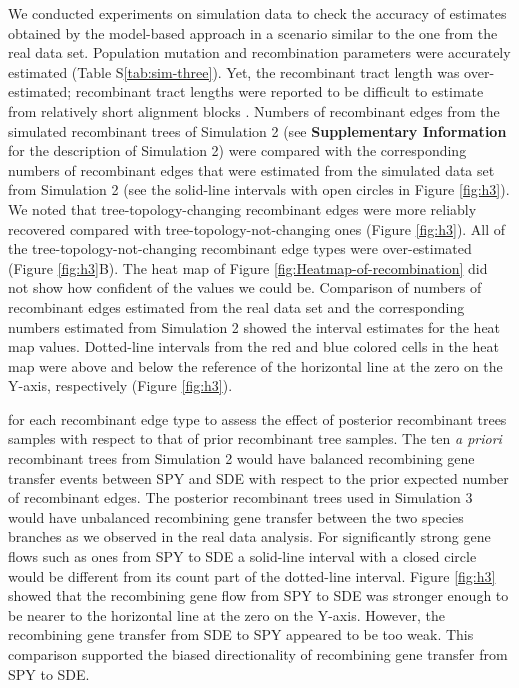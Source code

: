 \documentclass[10pt]{article}
\let\citep\cite
\begin{document}
We conducted experiments on simulation data to check the accuracy of estimates
obtained by the model-based approach in a scenario similar to the one from the
real data set.  Population mutation and recombination parameters were accurately
estimated (Table S\ref{tab:sim-three}).  Yet, the recombinant tract length was
over-estimated; recombinant tract lengths were reported to be difficult to
estimate from relatively short alignment blocks \citep{Didelot2010}.  Numbers of
recombinant edges from the simulated recombinant trees of Simulation 2 (see
\textbf{Supplementary Information} for the description of Simulation 2) were
compared with the corresponding numbers of recombinant edges that were estimated
from the simulated data set from Simulation 2 (see the solid-line intervals with
open circles in Figure \ref{fig:h3}).  We noted that tree-topology-changing
recombinant edges were more reliably recovered compared with
tree-topology-not-changing ones (Figure \ref{fig:h3}). All of the
tree-topology-not-changing recombinant edge types were over-estimated (Figure
\ref{fig:h3}B). The heat map of Figure \ref{fig:Heatmap-of-recombination} did
not show how confident of the values we could be. Comparison of numbers of
recombinant edges estimated from the real data set and the corresponding numbers
estimated from Simulation 2 showed the interval estimates for the heat map
values.  Dotted-line intervals from the red and blue colored cells in the heat
map were above and below the reference of the horizontal line at the zero on the
Y-axis, respectively (Figure \ref{fig:h3}).  

for each recombinant edge type to assess the effect of posterior recombinant
trees samples with respect to that of prior recombinant tree samples. The ten
\textit{a priori} recombinant trees from Simulation 2 would have balanced
recombining gene transfer events between SPY and SDE with respect to the prior
expected number of recombinant edges. The posterior recombinant trees used in
Simulation 3 would have unbalanced recombining gene transfer between the two
species branches as we observed in the real data analysis. For significantly
strong gene flows such as ones from SPY to SDE a solid-line interval with a
closed circle would be different from its count part of the dotted-line
interval.  Figure \ref{fig:h3} showed that the recombining gene flow from SPY to
SDE was stronger enough to be nearer to the horizontal line at the zero on the
Y-axis. However, the recombining gene transfer from SDE to SPY appeared to be
too weak.  This comparison supported the biased directionality of recombining
gene transfer from SPY to SDE.
\end{document}

